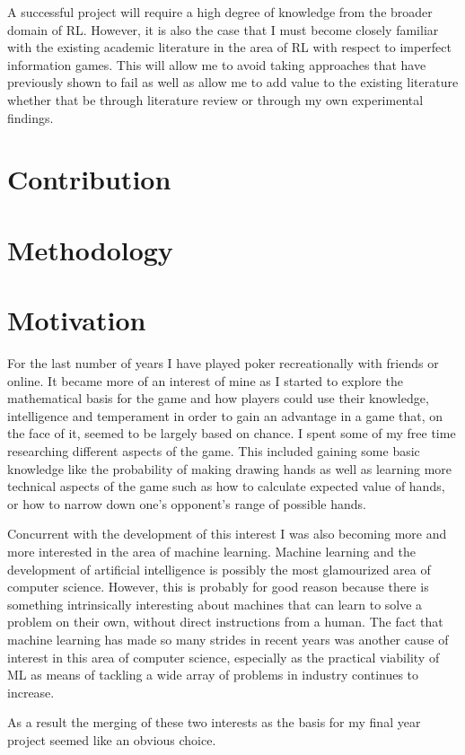A successful project will require a high degree of knowledge from the broader domain of RL. However, it is also the case
that I must become closely familiar with the existing academic literature in the area of RL with respect to imperfect
information games.
This will allow me to avoid taking approaches that have previously shown to fail as well as allow me to add value to
the existing literature whether that be through literature review or through my own experimental findings.


\section{Contribution}\label{sec:contribution}

\section{Methodology}\label{sec:methodology}

\section{Motivation}\label{sec:Motivation}
For the last number of years I have played poker recreationally with friends or online.
It became more of an interest of mine as I started to explore the mathematical basis for the game and how
players could use their knowledge, intelligence and temperament in order to gain an advantage in a game that,
on the face of it, seemed to be largely based on chance.
I spent some of my free time researching different aspects of the game.
This included gaining some basic knowledge like the probability of making drawing hands as well as learning more
technical aspects of the game such as how to calculate expected value of hands,
or how to narrow down one's opponent's range of possible hands.

Concurrent with the development of this interest I was also becoming more and more interested in the area
of machine learning.
Machine learning and the development of artificial intelligence is possibly the most glamourized area
of computer science.
However, this is probably for good reason because there is something intrinsically interesting
about machines that can learn to solve a problem on their own, without direct instructions from a human.
The fact that machine learning has made so many strides in recent years was another cause of interest in
this area of computer science, especially as the practical viability of ML as means of tackling a wide array
of problems in industry continues to increase.

As a result the merging of these two interests as the basis for my final year project seemed like an obvious choice.